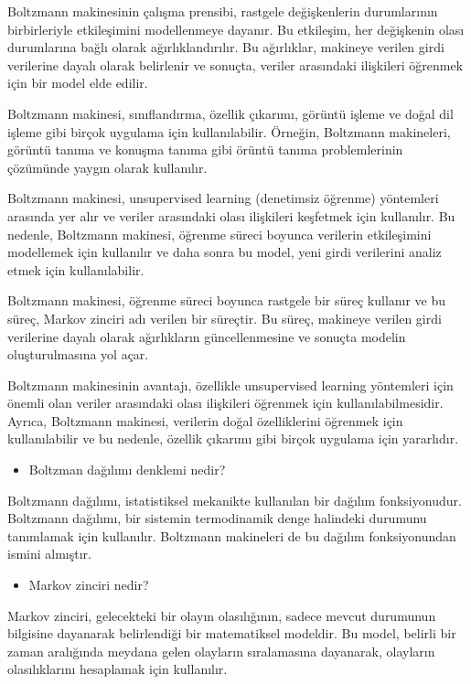 \documentclass[11pt]{article}
\begin{document}
Boltzmann makinesinin çalışma prensibi, rastgele değişkenlerin durumlarının birbirleriyle etkileşimini modellenmeye dayanır. Bu etkileşim, her değişkenin olası durumlarına bağlı olarak ağırlıklandırılır. Bu ağırlıklar, makineye verilen girdi verilerine dayalı olarak belirlenir ve sonuçta, veriler arasındaki ilişkileri öğrenmek için bir model elde edilir.

Boltzmann makinesi, sınıflandırma, özellik çıkarımı, görüntü işleme ve doğal dil işleme gibi birçok uygulama için kullanılabilir. Örneğin, Boltzmann makineleri, görüntü tanıma ve konuşma tanıma gibi örüntü tanıma problemlerinin çözümünde yaygın olarak kullanılır.

Boltzmann makinesi, unsupervised learning (denetimsiz öğrenme) yöntemleri arasında yer alır ve veriler arasındaki olası ilişkileri keşfetmek için kullanılır. Bu nedenle, Boltzmann makinesi, öğrenme süreci boyunca verilerin etkileşimini modellemek için kullanılır ve daha sonra bu model, yeni girdi verilerini analiz etmek için kullanılabilir.

Boltzmann makinesi, öğrenme süreci boyunca rastgele bir süreç kullanır ve bu süreç, Markov zinciri adı verilen bir süreçtir. Bu süreç, makineye verilen girdi verilerine dayalı olarak ağırlıkların güncellenmesine ve sonuçta modelin oluşturulmasına yol açar.

Boltzmann makinesinin avantajı, özellikle unsupervised learning yöntemleri için önemli olan veriler arasındaki olası ilişkileri öğrenmek için kullanılabilmesidir. Ayrıca, Boltzmann makinesi, verilerin doğal özelliklerini öğrenmek için kullanılabilir ve bu nedenle, özellik çıkarımı gibi birçok uygulama için yararlıdır.
\begin{itemize}
    \item Boltzman dağılımı denklemi nedir?
\end{itemize}
Boltzmann dağılımı, istatistiksel mekanikte kullanılan bir dağılım fonksiyonudur. Boltzmann dağılımı, bir sistemin termodinamik denge halindeki durumunu tanımlamak için kullanılır. Boltzmann makineleri de bu dağılım fonksiyonundan ismini almıştır.
\begin{itemize}
    \item Markov zinciri nedir?
\end{itemize}
Markov zinciri, gelecekteki bir olayın olasılığının, sadece mevcut durumunun bilgisine dayanarak belirlendiği bir matematiksel modeldir. Bu model, belirli bir zaman aralığında meydana gelen olayların sıralamasına dayanarak, olayların olasılıklarını hesaplamak için kullanılır.
\end{document}
